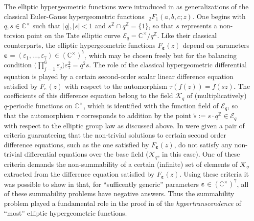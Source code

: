 \documentclass[preprint,12pt]{elsarticle}
\numberwithin{equation}{section} %
\theoremstyle{theorem}
\theoremstyle{definition}
\newcommand{\bk}{\mathcal{K}} %
\newcommand{\bkq}{\bk_{q}} %
\newcommand{\ec}{\mathcal{E}} %
\newcommand{\ecq}{\ec_{q}}
\newcommand{\C}{\mathbb{C}} %
\newcommand{\Z}{\mathbb{Z}} %
\begin{document}
The elliptic hypergeometric functions were introduced in \cite{Spiridonov2008} as generalizations of the classical Euler-Gauss hypergeometric functions $\phantom{.}_2F_1(a,b,c;z)$. One begins with $q,s\in\C^\times$ such that $|q|,|s|<1$ and $s^\Z\cap q^\Z=\{1\}$, so that $s$ represents a non-torsion point on the Tate elliptic curve $\ecq=\C^\times/q^\Z$. Like their classical counterparts, the elliptic hypergeometric functions $F_{\boldsymbol{\varepsilon}}(z)$ depend on parameters $\boldsymbol{\varepsilon}=(\varepsilon_1,\dots,\varepsilon_7)\in(\C^\times)^7$, which may be chosen freely but for the balancing condition $\bigl(\prod_{j=1}^6\varepsilon_j)\varepsilon_7^2=q^2s$. The role of the classical hypergeometric differential equation is played by a certain second-order scalar linear difference equation satisfied by $F_{\boldsymbol{\varepsilon}}(z)$ with respect to the automorphism $\tau(f(z))=f(sz)$. The coefficients of this difference equation belong to the field $\bkq$ of (multiplicatively) $q$-periodic functions on $\C^\times$, which is identified with the function field of $\ecq$, so that the automorphism $\tau$ corresponds to addition by the point $\check{s}:=s\cdot q^\Z\in\ecq$ with respect to the elliptic group law as discussed above. In \cite{Arreche2021} were given a pair of criteria guaranteeing that the non-trivial solutions to certain second order difference equations, such as the one satisfied by $F_{\boldsymbol{\varepsilon}}(z)$, do not satisfy any non-trivial differential equations over the base field ($\bkq$, in this case). One of these criteria demands the non-summability of a certain (infinite) set of elements of $\bkq$ extracted from the difference equation satisfied by $F_{\boldsymbol{\varepsilon}}(z)$. Using these criteria it was possible to show in \cite{Arreche2021} that, for ``sufficently generic'' parameters $\boldsymbol{\varepsilon}\in(\C^\times)^7$, all of these summability problems have negative answers. Thus the summability problem  played a fundamental role in the proof in \cite{Arreche2021} of the \emph{hypertranscendence} of ``most'' elliptic hypergeometric functions. 
%
\end{document}
